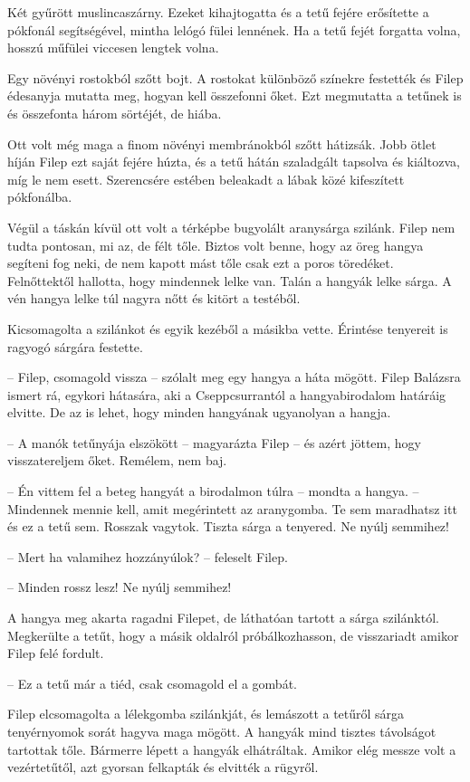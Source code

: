 \documentclass[10pt]{memoir}
\begin{document}
Két gyűrött muslincaszárny. Ezeket kihajtogatta és a tetű fejére erősítette a
pókfonál segítségével, mintha lelógó fülei lennének. Ha a tetű fejét forgatta
volna, hosszú műfülei viccesen lengtek volna.

Egy növényi rostokból szőtt bojt. A rostokat különböző színekre festették és
Filep édesanyja mutatta meg, hogyan kell összefonni őket. Ezt megmutatta a
tetűnek is és összefonta három sörtéjét, de hiába.

Ott volt még maga a finom növényi membránokból szőtt hátizsák. Jobb ötlet híján
Filep ezt saját fejére húzta, és a tetű hátán szaladgált tapsolva és kiáltozva,
míg le nem esett. Szerencsére estében beleakadt a lábak közé kifeszített
pókfonálba.

Végül a táskán kívül ott volt a térképbe bugyolált aranysárga szilánk. Filep
nem tudta pontosan, mi az, de félt tőle. Biztos volt benne, hogy az öreg hangya
segíteni fog neki, de nem kapott mást tőle csak ezt a poros töredéket.
Felnőttektől hallotta, hogy mindennek lelke van. Talán a hangyák lelke sárga. A
vén hangya lelke túl nagyra nőtt és kitört a testéből.

Kicsomagolta a szilánkot és egyik kezéből a másikba vette. Érintése tenyereit
is ragyogó sárgára festette.

-- Filep, csomagold vissza -- szólalt meg egy hangya a háta mögött. Filep
Balázsra ismert rá, egykori hátasára, aki a Cseppcsurrantól a hangyabirodalom
határáig elvitte. De az is lehet, hogy minden hangyának ugyanolyan a hangja.

-- A manók tetűnyája elszökött -- magyarázta Filep -- és azért jöttem, hogy
visszatereljem őket. Remélem, nem baj.

-- Én vittem fel a beteg hangyát a birodalmon túlra -- mondta a hangya. --
Mindennek mennie kell, amit megérintett az aranygomba. Te sem maradhatsz itt és
ez a tetű sem. Rosszak vagytok. Tiszta sárga a tenyered. Ne nyúlj semmihez!

-- Mert ha valamihez hozzányúlok? -- feleselt Filep.

-- Minden rossz lesz! Ne nyúlj semmihez!

A hangya meg akarta ragadni Filepet, de láthatóan tartott a sárga szilánktól.
Megkerülte a tetűt, hogy a másik oldalról próbálkozhasson, de visszariadt
amikor Filep felé fordult.

-- Ez a tetű már a tiéd, csak csomagold el a gombát.

Filep elcsomagolta a lélekgomba szilánkját, és lemászott a tetűről sárga
tenyérnyomok sorát hagyva maga mögött. A hangyák mind tisztes távolságot
tartottak tőle. Bármerre lépett a hangyák elhátráltak. Amikor elég messze volt
a vezértetűtől, azt gyorsan felkapták és elvitték a rügyről.
\end{document}
